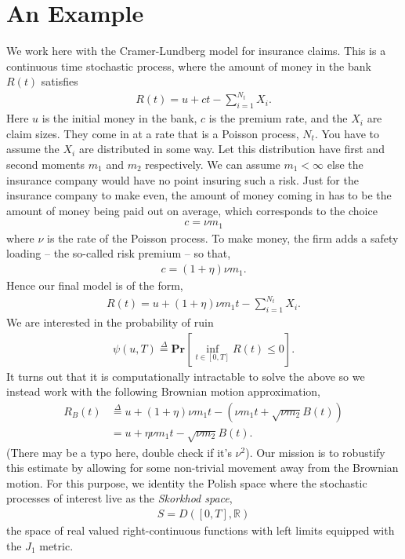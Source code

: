 \documentclass[12pt]{article}
\newcommand{\R}{\mathbb{R}}
\renewcommand{\Pr}{\textbf{Pr}}
\newcommand{\define}{\overset{\Delta}{=}}
\theoremstyle{definition}
\theoremstyle{definition}
\theoremstyle{definition}
\begin{document}
\section*{An Example}
We work here with the Cramer-Lundberg model for insurance claims. This is a continuous time stochastic process, where the amount of money in the bank $R(t)$ satisfies
\begin{align*}
R(t)=u+ct-\sum_{i=1}^{N_t}X_i.
\end{align*}
Here $u$ is the initial money in the bank, $c$ is the premium rate, and the $X_i$ are claim sizes. They come in at a rate that is a Poisson process, $N_t$. You have to assume the $X_i$ are distributed in some way. Let this distribution have first and second moments $m_1$ and $m_2$ respectively. We can assume $m_1<\infty$ else the insurance company would have no point insuring such a risk. Just for the insurance company to make even, the amount of money coming in has to be the amount of money being paid out on average, which corresponds to the choice
\begin{align*}
c=\nu m_1
\end{align*}
where $\nu$ is the rate of the Poisson process. To make money, the firm adds a safety loading -- the so-called risk premium -- so that,
\begin{align*}
c=(1+\eta)\nu m_1.
\end{align*}
Hence our final model is of the form,
\begin{align*}
R(t)=u+(1+\eta)\nu m_1t-\sum_{i=1}^{N_t}X_i.
\end{align*}
We are interested in the probability of ruin
\begin{align*}
\psi(u,T)\define\Pr\left[\inf_{t\in[0,T]} R(t)\leq 0\right].
\end{align*}
It turns out that it is computationally intractable to solve the above so we instead work with the following Brownian motion approximation,
\begin{align*}
R_B(t)&\define u+(1+\eta)\nu m_1t - (\nu m_1t + \sqrt{\nu m_2}B(t))\\
&=u+\eta \nu m_1t-\sqrt{\nu m_2}B(t).
\end{align*}
(There may be a typo here, double check if it's $\nu^2$). Our mission is to robustify this estimate by allowing for some non-trivial movement away from the Brownian motion. For this purpose, we identity the Polish space where the stochastic processes of interest live as the \emph{Skorkhod space},
\begin{align*}
S=D([0,T],\R)
\end{align*}
the space of real valued right-continuous functions with left limits equipped with the $J_1$ metric. 
\end{document}
